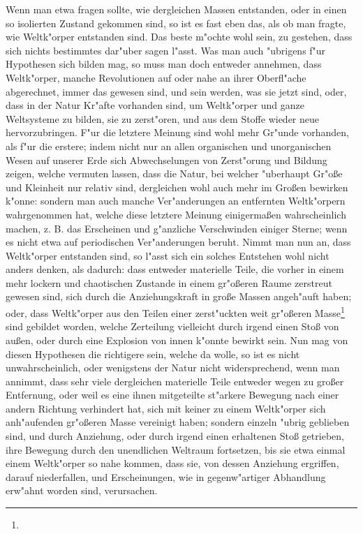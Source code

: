 \documentclass[a4paper, 11pt, oneside, polutonikogreek, german]{article}
\begin{document}
Wenn man etwa fragen sollte, wie dergleichen Massen entstanden, oder in einen so isolierten Zustand gekommen sind, so ist es fast eben das, als ob man fragte, wie Weltk"orper entstanden sind. Das beste m"ochte wohl sein, zu gestehen, dass sich nichts bestimmtes dar"uber sagen l"asst. Was man auch "ubrigens f"ur Hypothesen sich bilden mag, so muss man doch entweder annehmen, dass Weltk"orper, manche Revolutionen auf oder nahe an ihrer Oberfl"ache abgerechnet, immer das gewesen sind, und sein werden, was sie jetzt sind, oder, dass in der Natur Kr"afte vorhanden sind, um Weltk"orper und ganze Weltsysteme zu bilden, sie zu zerst"oren, und aus dem Stoffe wieder neue hervorzubringen. F"ur die letztere Meinung sind wohl mehr Gr"unde vorhanden, als f"ur die erstere; indem nicht nur an allen organischen und unorganischen Wesen auf unserer Erde sich Abwechselungen von Zerst"orung und Bildung zeigen, welche vermuten lassen, dass die Natur, bei welcher "uberhaupt Gr"oße und Kleinheit nur relativ sind, dergleichen wohl auch mehr im Großen bewirken k"onne: sondern man auch manche Ver"anderungen an entfernten Weltk"orpern wahrgenommen hat, welche diese letztere Meinung einigermaßen wahrscheinlich machen, z. B. das Erscheinen und g"anzliche Verschwinden einiger Sterne; wenn es nicht etwa auf periodischen Ver"anderungen beruht. Nimmt man nun an, dass Weltk"orper entstanden sind, so l"asst sich ein solches Entstehen wohl nicht anders denken, als dadurch: dass entweder materielle Teile, die vorher in einem mehr lockern und chaotischen Zustande in einem gr"oßeren Raume zerstreut gewesen sind, sich durch die Anziehungskraft in große Massen angeh"auft haben; oder, dass Weltk"orper aus den Teilen einer zerst"uckten weit gr"oßeren Masse\footnote{} sind gebildet worden, welche Zerteilung vielleicht durch irgend einen Stoß von außen, oder durch eine Explosion von innen k"onnte bewirkt sein. Nun mag von diesen Hypothesen die richtigere sein, welche da wolle, so ist es nicht unwahrscheinlich, oder wenigstens der Natur nicht widersprechend, wenn man annimmt, dass sehr viele dergleichen materielle Teile entweder wegen zu großer Entfernung, oder weil es eine ihnen mitgeteilte st"arkere Bewegung nach einer andern Richtung verhindert hat, sich mit keiner zu einem Weltk"orper sich anh"aufenden gr"oßeren Masse vereinigt haben; sondern einzeln "ubrig geblieben sind, und durch Anziehung, oder durch irgend einen erhaltenen Stoß getrieben, ihre Bewegung durch den unendlichen Weltraum fortsetzen, bis sie etwa einmal einem Weltk"orper so nahe kommen, dass sie, von dessen Anziehung ergriffen, darauf niederfallen, und Erscheinungen, wie in gegenw"artiger Abhandlung erw"ahnt worden sind, verursachen.
\end{document}
